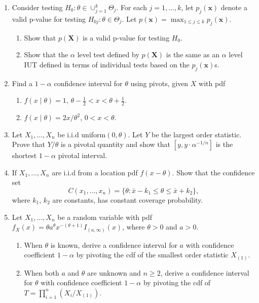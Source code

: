 \documentclass[12pt]{extarticle}
\newcommand{\x}{\mathbf x}
\newcommand{\X}{\mathbf X}
\begin{document}
\begin{enumerate}


	\item Consider testing $H_0: \theta \in \cup_{j = 1}^k\Theta_j$. For each $j = 1,\ldots,k$, let $p_j(\x)$ denote a valid p-value for testing $H_{0j}: \theta\in\Theta_j$. Let $p(\x) = \max_{1\leq j\leq k}p_j(\x)$.
	\begin{enumerate}
		\item Show that $p(\X)$ is a valid p-value for testing $H_0$.
		\item Show that the $\alpha$ level test defined by $p(\X)$ is the same as an $\alpha$ level IUT defined in terms of individual tests based on the $p_j(\x)$s.
	\end{enumerate}
	\vspace{8cm}
	
	 \item Find a $1 - \alpha$ confidence interval for $\theta$ using pivots, given $X$ with pdf
	\begin{enumerate}
		\item $f(x\mid \theta) = 1$, $\theta - \frac{1}{2}<x<\theta + \frac{1}{2}$.
		\item $f(x\mid \theta) = 2x/\theta^2$, $0<x<\theta$.
	\end{enumerate}
	\newpage
	\item Let $X_1,\ldots, X_n$ be i.i.d uniform$(0, \theta)$. Let $Y$ be the largest order statistic. Prove that $Y/\theta$ is a pivotal quantity and show that $[y, y\cdot\alpha^{-1/n}]$ is the shortest $1 - \alpha$ pivotal interval. 
	\vspace{4cm}
	\item If $X_1, \ldots, X_n$ are i.i.d from a location pdf $f(x - \theta)$. Show that the confidence set $$C(x_1,\ldots, x_n) = \{\theta: \bar x - k_1\leq \theta\leq \bar x + k_2\},$$
where $k_1$, $k_2$ are constants, has constant coverage probability.

	
	\vspace{4cm}
		\item Let $X_1,\ldots,X_n$ be a random variable with pdf $f_X(x) = \theta a^\theta x^{-(\theta+1)}I_{(a,\infty)}(x)$, where $\theta>0$ and $a>0$.
	\begin{enumerate}
		\item When $\theta$ is known, derive a confidence interval for $a$ with confidence coefficient $1 - \alpha$ by pivoting the cdf of the smallest order statistic $X_{(1)}$.
		
		\item When both $a$ and $\theta$ are unknown and $n\geq 2$, derive a confidence interval for $\theta$ with confidence coefficient $1 - \alpha$ by pivoting the cdf of $T = \prod_{i = 1}^{n}(X_i/X_{(1)})$.
		

\end{enumerate}
\end{enumerate}
\end{document}
